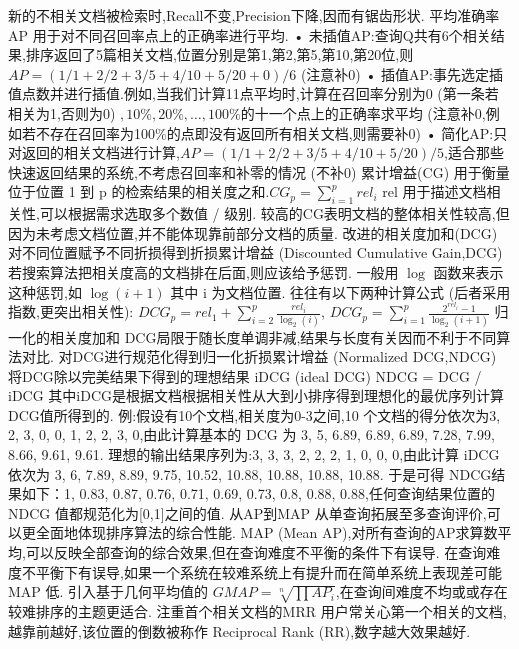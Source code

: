 \documentclass[10pt, utf8]{ctexart}
\begin{document}
\begin{multicols}{4}
    新的不相关文档被检索时,Recall不变,Precision下降,因而有{\color{red}锯齿}形状.
    {\color{red}平均准确率AP}
    用于对不同召回率点上的正确率进行平均.
    • 未插值AP:查询Q共有6个相关结果,排序返回了5篇相关文档,位置分别是第1,第2,第5,第10,第20位,则$AP=(1/1+2/2+3/5+4/10+5/20+0)/6$ (注意补0)
    • 插值AP:事先选定插值点数并进行插值.例如,当我们计算11点平均时,计算在召回率分别为$0$ (第一条若相关为1,否则为0) $,10\%,20\%,\ldots,100\%$的十一个点上的正确率求平均 (注意补0,例如若不存在召回率为100\%的点即没有返回所有相关文档,则需要补0)
    • 简化AP:只对返回的相关文档进行计算,$AP=(1/1+2/2+3/5+4/10+5/20)/5$,适合那些快速返回结果的系统,不考虑召回率和补零的情况 (不补0)
    {\color{red}累计增益(CG)}
    用于衡量位于位置 1 到 p 的检索结果的相关度之和.$CG_p=\sum_{i=1}^{p} rel_i$
    rel 用于描述文档相关性,可以根据需求选取多个数值 / 级别.
    较高的CG表明文档的整体相关性较高,但因为未考虑文档位置,并不能体现靠前部分文档的质量.
    {\color{red}改进的相关度加和(DCG)}
    对不同位置赋予不同折损得到折损累计增益 (Discounted Cumulative Gain,DCG)
    若搜索算法把相关度高的文档排在后面,则应该给予惩罚.
    一般用 $\log$ 函数来表示这种惩罚,如 $\log(i+1)$ 其中 i 为文档位置.
    往往有以下两种计算公式 (后者采用指数,更突出相关性):
    $DCG_p=rel_1+\sum_{i=2}^{p}\frac{rel_i}{\log_2(i)}$,
    $DCG_p=\sum_{i=1}^{p}\frac{2^{rel_i}-1}{\log_2(i+1)}$
    {\color{red}归一化的相关度加和}
    DCG局限于随长度单调非减,结果与长度有关因而不利于不同算法对比.
    对DCG进行规范化得到归一化折损累计增益 (Normalized DCG,NDCG)
    将DCG除以完美结果下得到的理想结果 iDCG (ideal DCG)
    NDCG = DCG / iDCG
    其中iDCG是根据文档根据相关性从大到小排序得到理想化的最优序列计算DCG值所得到的.
    例:假设有10个文档,相关度为0-3之间,10 个文档的得分依次为3, 2, 3, 0, 0, 1, 2, 2, 3, 0,由此计算基本的 DCG 为 3, 5, 6.89, 6.89, 6.89, 7.28, 7.99, 8.66, 9.61, 9.61.
    理想的输出结果序列为:3, 3, 3, 2, 2, 2, 1, 0, 0, 0,由此计算 iDCG依次为 3, 6, 7.89, 8.89, 9.75, 10.52, 10.88, 10.88, 10.88, 10.88.
    于是可得 NDCG结果如下：1, 0.83, 0.87, 0.76, 0.71, 0.69, 0.73, 0.8, 0.88, 0.88,任何查询结果位置的NDCG 值都规范化为[0,1]之间的值.
    {\color{red}从AP到MAP}
    从单查询拓展至多查询评价,可以更全面地体现排序算法的综合性能.
    MAP (Mean AP),对所有查询的AP求算数平均,可以反映全部查询的综合效果,但在查询难度不平衡的条件下有误导.
    在查询难度不平衡下有误导,如果一个系统在较难系统上有提升而在简单系统上表现差可能 MAP 低.
    引入基于几何平均值的 $GMAP=\sqrt[n]{\prod AP_i}$,在查询间难度不均或或存在较难排序的主题更适合.
    {\color{red}注重首个相关文档的MRR}
    用户常关心第一个相关的文档,越靠前越好,该位置的倒数被称作 Reciprocal Rank (RR),数字越大效果越好.

\end{multicols}
\end{document}
